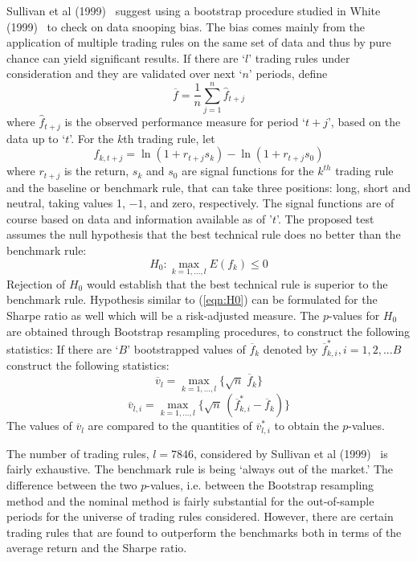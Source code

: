 Sullivan et al (1999)~\cite{sullivan1999data} suggest using a bootstrap procedure studied in White (1999)~\cite{white1999} to check on data snooping bias. The bias comes mainly from the application of multiple trading rules on the same set of data and thus by pure chance can yield significant results. If there are `$l$' trading rules under consideration and they are validated over next `$n$' periods, define
	\begin{equation}\label{eqn:barf}
	\overline{f}= \frac{1}{n}\sum_{j=1}^n\hat{f}_{t+j}
	\end{equation}
where $\hat{f}_{t+j}$ is the observed performance measure for period `$t+j$', based on the data up to `$t$'. For the $k$th trading rule, let
	\begin{equation}\label{eqn:fktj}
	f_{k,t+j}= \ln(1+r_{t+j} s_k) - \ln(1+r_{t+j} s_0)
	\end{equation}
where $r_{t+j}$ is the return, $s_k$ and $s_0$ are signal functions for the $k^{th}$ trading rule and the baseline or benchmark rule, that can take three positions: long, short and neutral, taking values 1, $-1$, and zero, respectively. The signal functions are of course based on data and information available as of '$t$'. The proposed test assumes the null hypothesis that the best technical rule does no better than the benchmark rule:
	\begin{equation}\label{eqn:H0}
	H_0: \max_{k=1,\ldots,l}E(f_k) \leq 0
	\end{equation}
Rejection of $H_0$ would establish that the best technical rule is superior to the benchmark rule. Hypothesis similar to (\ref{eqn:H0}) can be formulated for the Sharpe ratio as well which will be a risk-adjusted measure. The $p$-values for $H_0$ are obtained through Bootstrap resampling procedures, to construct the following statistics:
If there are `$B$' bootstrapped values of $\overline{f}_k$ denoted by $\overline{f}_{k,i}^*, i=1,2,...B$ construct the following statistics:
	\begin{equation}\label{eqn:linev}
	\overline{v}_l = \max_{k=1,\ldots,l} \{\sqrt{n}\;\overline{f}_k\}
	\end{equation}
	\begin{equation}\label{eqn:linevli}
	\overline{v}_{l,i} = \max_{k=1,\ldots,l} \{\sqrt{n}\,(\overline{f}_{k,i}^* - \overline{f}_k) \}
	\end{equation}
The values of $\overline{v}_l$ are compared to the quantities of $\overline{v}_{l,i}^*$ to obtain the $p$-values.


The number of trading rules, $l=7846$, considered by Sullivan et al (1999)~\cite{sullivan1999data} is fairly exhaustive. The benchmark rule is being `always out of the market.' The difference between the two $p$-values, i.e. between the Bootstrap resampling method and the nominal method is fairly substantial for the out-of-sample periods for the universe of trading rules considered. However, there are certain trading rules that are found to outperform the benchmarks both in terms of the average return and the Sharpe ratio.


